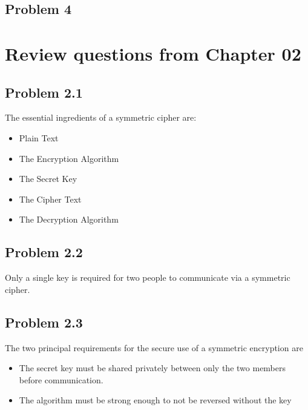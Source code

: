 \documentclass[14pt]{article}
\begin{document}
\subsection{Problem  4}



\newpage


\section{Review questions from Chapter 02}

\subsection{Problem  2.1}
The essential ingredients of a symmetric cipher are:
\begin{itemize}
\item Plain Text
\item The Encryption Algorithm
\item The Secret Key
\item The Cipher Text
\item The Decryption Algorithm
\end{itemize}

\subsection{Problem  2.2}
Only a single key is required for two people to communicate via a symmetric cipher.

\subsection{Problem  2.3}
The two principal requirements for the secure use of a symmetric encryption are
\begin{itemize}
\item The secret key must be shared privately between only the two members before communication.
\item The algorithm must be strong enough to not be reversed without the key
\end{itemize}
\end{document}
